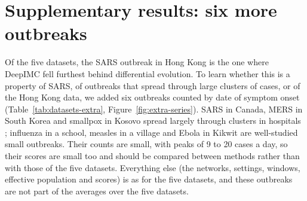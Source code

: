 \documentclass[12pt]{article}
\begin{document}
\section{Supplementary results: six more outbreaks}\label{app:extra}

Of the five datasets, the SARS outbreak in Hong Kong is the one where DeepIMC fell furthest behind differential
evolution. To learn whether this is a property of SARS, of outbreaks that spread through large clusters of cases, or
of the Hong Kong data, we added six outbreaks counted by date of symptom onset (Table~\ref{tab:datasets-extra},
Figure~\ref{fig:extra-series}). SARS in Canada, MERS in South Korea and smallpox in Kosovo spread largely through
clusters in hospitals \autocite{cowling2015preliminary,fenner1988smallpox}; influenza in a school, measles in a
village and Ebola in Kikwit are well-studied small outbreaks. Their counts are small, with peaks of 9 to 20 cases a
day, so their scores are small too and should be compared between methods rather than with those of the five
datasets. Everything else (the networks, settings, windows, effective population and scores) is as for the five
datasets, and these outbreaks are not part of the averages over the five datasets.
\end{document}
